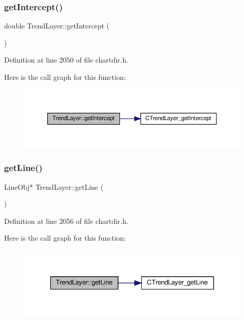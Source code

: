 \subsubsection{\texorpdfstring{get\+Intercept()}{getIntercept()}}
{\footnotesize\ttfamily double Trend\+Layer\+::get\+Intercept (\begin{DoxyParamCaption}{ }\end{DoxyParamCaption})\hspace{0.3cm}{\ttfamily [inline]}}



Definition at line 2050 of file chartdir.\+h.

Here is the call graph for this function\+:
\nopagebreak
\begin{figure}[H]
\begin{center}
\leavevmode
\includegraphics[width=350pt]{class_trend_layer_aed613d07e0863cacf976363ea5fe739f_cgraph}
\end{center}
\end{figure}
\mbox{\label{class_trend_layer_ad608d20a7d52b0262ceb0476e1db4a41}} 
\subsubsection{\texorpdfstring{get\+Line()}{getLine()}}
{\footnotesize\ttfamily Line\+Obj$\ast$ Trend\+Layer\+::get\+Line (\begin{DoxyParamCaption}{ }\end{DoxyParamCaption})\hspace{0.3cm}{\ttfamily [inline]}}



Definition at line 2056 of file chartdir.\+h.

Here is the call graph for this function\+:
\nopagebreak
\begin{figure}[H]
\begin{center}
\leavevmode
\includegraphics[width=329pt]{class_trend_layer_ad608d20a7d52b0262ceb0476e1db4a41_cgraph}
\end{center}
\end{figure}
\mbox{\label{class_trend_layer_a58989a5b0fc6ed23b5bb7433f792bc6c}} 
